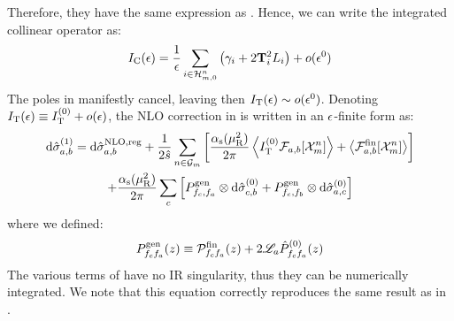 Therefore, they have the same expression as . Hence, we can write the integrated collinear operator as:
\begin{equation}
  I_\text{C}(\epsilon) = \frac{1}{\epsilon} \sum_{i \in \mathcal{H}^{n}_{m,0}} \left( \gamma_i + 2 \mathbf{T}_i^2 L_i \right) + o(\epsilon^0)
  \label{eq:ic-exp}
\end{equation}
The poles in  manifestly cancel, leaving then $ I_\text{T}(\epsilon) \sim o(\epsilon^0) $. Denoting $ I_\text{T}(\epsilon) \equiv I_\text{T}^{(0)} + o(\epsilon) $, the NLO correction in  is written in an $ \epsilon $-finite form as:
\begin{multline}
  \mathrm{d}\hat{\sigma}_{a,b}^{(1)} = \mathrm{d}\hat{\sigma}_{a,b}^\text{NLO,reg} + \frac{1}{2\hat{s}} \sum_{n \in \mathcal{G}_m} \left[ \frac{\alpha_\text{s}(\mu_\text{R}^2)}{2\pi} \left\langle I_\text{T}^{(0)} \mathcal{F}_{a,b}[\mathcal{X}^{n}_{m}] \right\rangle + \left\langle \mathcal{F}_{a,b}^\text{fin}[\mathcal{X}^{n}_{m}] \right\rangle \right] \\
  + \frac{\alpha_\text{s}(\mu_\text{R}^2)}{2\pi} \sum_c \left[ P^\text{gen}_{f_c , f_a} \otimes \mathrm{d}\hat{\sigma}^{(0)}_{c,b} + P^\text{gen}_{f_c , f_b} \otimes \mathrm{d}\hat{\sigma}^{(0)}_{a,c} \right]
  \label{eq:nlo-finite-massless}
\end{multline}
where we defined:
\begin{equation}
  P^\text{gen}_{f_c f_a}(z) \equiv \mathcal{P}^\text{fin}_{f_c f_a}(z) + 2 \mathscr{L}_a \hat{P}^{(0)}_{f_c f_a}(z)
\end{equation}
The various terms of  have no IR singularity, thus they can be numerically integrated. We note that this equation correctly reproduces the same result as in \cite{rontsch-2509}.










